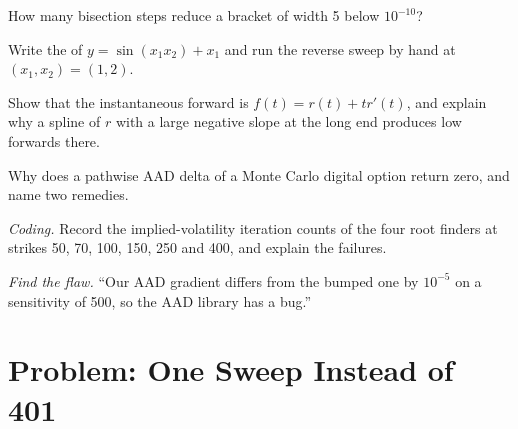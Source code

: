 \begin{exercise}[$\star$]\label{exo:qm:transforms-interpolation-and-algorithmic-differentiation:3}
How many bisection steps reduce a bracket of width 5 below $10^{-10}$?
\end{exercise}

\begin{exercise}[$\star\star$]\label{exo:qm:transforms-interpolation-and-algorithmic-differentiation:4}
Write the  of $y = \sin(x_1x_2) + x_1$ and run the reverse sweep by hand at $(x_1, x_2) = (1, 2)$.
\end{exercise}

\begin{exercise}[$\star\star$]\label{exo:qm:transforms-interpolation-and-algorithmic-differentiation:5}
Show that the instantaneous forward is $f(t) = r(t) + tr'(t)$, and explain why a spline of $r$ with a large negative slope at the long end produces low forwards there.
\end{exercise}

\begin{exercise}[$\star\star$]\label{exo:qm:transforms-interpolation-and-algorithmic-differentiation:6}
Why does a pathwise AAD delta of a Monte Carlo digital option return zero, and name two remedies.
\end{exercise}

\begin{exercise}[$\star\star\star$]\label{exo:qm:transforms-interpolation-and-algorithmic-differentiation:7}
\emph{Coding.} Record the implied-volatility iteration counts of the four root finders at strikes 50, 70, 100, 150, 250 and 400, and explain the failures.
\end{exercise}

\begin{exercise}[$\star\star\star$]\label{exo:qm:transforms-interpolation-and-algorithmic-differentiation:8}
\emph{Find the flaw.} ``Our AAD gradient differs from the bumped one by $10^{-5}$ on a sensitivity of 500, so the AAD library has a bug.''
\end{exercise}

\section{Problem: One Sweep Instead of 401}

